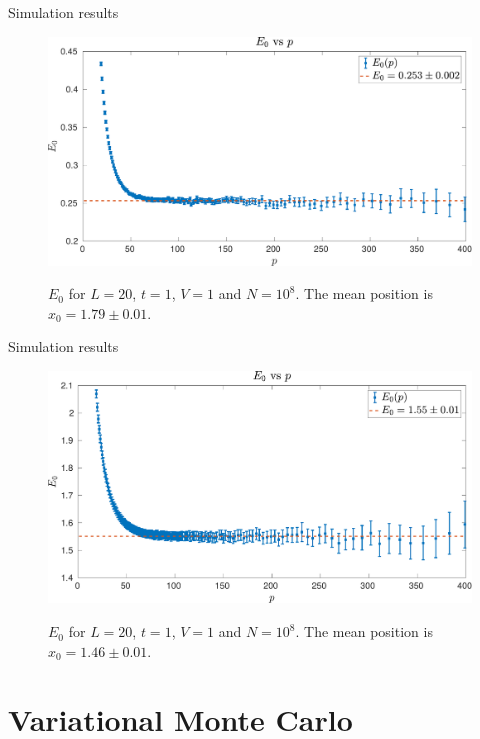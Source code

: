 \documentclass[10pt, compress, protectframetitle, handout]{beamer}
\begin{document}
\begin{frame}{Simulation results}

	\begin{figure}
		\centering
		\includegraphics[width=\textwidth]{Evsp-10E8}
		\label{fig:Evsp-10E8}
		\caption{$E_0$ for $L=20$, $t=1$, $V=1$ and $N=10^8$. The mean position is $x_0 = 1.79 \pm 0.01$.}
	\end{figure}

\end{frame}
	
\begin{frame}{Simulation results}

	\begin{figure}
		\centering
		\includegraphics[width=\textwidth]{Evsp-10E8-V2}
		\label{fig:Evsp-10E8-V2}
		\caption{$E_0$ for $L=20$, $t=1$, $V=1$ and $N=10^8$. The mean position is $x_0 = 1.46 \pm 0.01$.}
	\end{figure}

\end{frame}



\section{Variational Monte Carlo}
\end{document}
